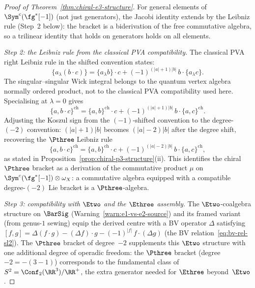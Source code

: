 \begin{proof}[Proof of Theorem~\ref{thm:chiral-e3-structure}]
For general elements of $\Sym^c(\fg^*[-1])$ (not just
generators), the Jacobi identity extends by the Leibniz
rule (Step~2 below): the bracket is a biderivation of the
free commutative algebra, so a trilinear identity that
holds on generators holds on all elements.

\textit{Step 2: the Leibniz rule from the classical PVA
compatibility.}
The classical PVA right Leibniz rule in the shifted convention
states:
\[
  \{a \mathbin{{}_\lambda} (b \cdot c)\}
  = \{a \mathbin{{}_\lambda} b\} \cdot c
  + (-1)^{(|a|+1)|b|}\,
  b \cdot \{a \mathbin{{}_\lambda} c\}.
\]
The singular--singular Wick integral belongs to the quantum vertex
algebra normally ordered product, not to the classical PVA
compatibility used here. Specialising at $\lambda = 0$ gives
\[
  \{a, b \cdot c\}^{\mathrm{ch}}
  = \{a, b\}^{\mathrm{ch}} \cdot c
  + (-1)^{(|a|+1)|b|}\,
  b \cdot \{a, c\}^{\mathrm{ch}}.
\]
Adjusting the Koszul sign from the $(-1)$-shifted
convention to the degree-$(-2)$ convention:
$(|a|+1)|b|$ becomes $(|a|-2)|b|$ after the degree shift,
recovering the $\Pthree$ Leibniz rule
\[
  \{a, b \cdot c\}^{\mathrm{ch}}
  = \{a, b\}^{\mathrm{ch}} \cdot c
  + (-1)^{(|a|-2)|b|}\,
  b \cdot \{a, c\}^{\mathrm{ch}},
\]
as stated in
Proposition~\ref{prop:chiral-p3-structure}(ii). This
identifies the chiral $\Pthree$ bracket as a derivation of
the commutative product
$\mu$ on $\Sym^c(\fg^*[-1]) \otimes \omega_X$: a
commutative algebra equipped with a compatible
degree-$(-2)$ Lie bracket is a $\Pthree$-algebra.

\textit{Step 3: compatibility with $\Etwo$ and the
$\Ethree$ assembly.}
The $\Etwo$-coalgebra structure on $\BarSig$
(Warning~\ref{warn:e1-vs-e2-source}) and its framed
variant (from genus-$1$ sewing) equip the derived centre
with a BV operator $\Delta$ satisfying
$[f, g] = \Delta(f \cdot g) - (\Delta f) \cdot g
- (-1)^{|f|}\,f \cdot (\Delta g)$
(the BV relation~\eqref{eq:bv-rel-sl2}).
The $\Pthree$ bracket of degree~$-2$ supplements
this $\Etwo$ structure with one additional degree of
operadic freedom:
the $\Pthree$ bracket
(degree $-2 = -(3-1)$) corresponds to the fundamental
class of $S^2 = \Conf_2(\RR^3)/\RR^+$, the extra
generator needed for $\Ethree$ beyond~$\Etwo$.


\end{proof}
